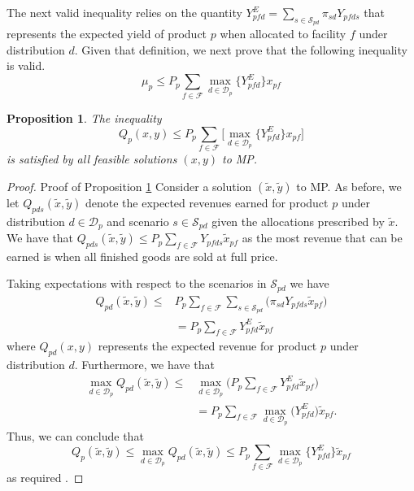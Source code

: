 \documentclass[12pt]{article}
\newtheorem{proposition}[theorem]{Proposition}%
\theoremstyle{thmstylethree}%
\begin{document}
The next valid inequality relies on the quantity $Y^E_{pfd} =  \sum_{s\in\mathcal{S}_{pd}}\pi_{sd}Y_{pfds}$ that represents the expected yield of product $p$ when allocated to facility $f$ under distribution $d.$ Given that definition, we next prove that the following inequality is valid.
\begin{equation}\label{eq:vi2}
\mu_p \leq P_p\sum_{f\in\mathcal{F}}\max_{d\in\mathcal{D}_{p}} \big\{Y^E_{pfd}\big\}x_{pf} \tag{VI2}   
\end{equation}

\noindent
\begin{proposition}\label{prop:VI2}
The inequality $$Q_p(x,y)\leq P_p\sum_{f\in\mathcal{F}}\Bigg[\max_{d\in\mathcal{D}_p}\{Y^E_{pfd}\big\}x_{pf}\Bigg]$$ is satisfied by all feasible solutions $(x,y)$ to MP.
\end{proposition}
\noindent
\begin{proof}{Proof of Proposition \ref{prop:VI2}}
Consider a solution $(\tilde{x},\tilde{y})$ to MP. As before, we let $Q_{pds}(\tilde{x},\tilde{y})$ denote the expected revenues earned for product $p$ under distribution $d \in \mathcal{D}_p$ and scenario $s\in\mathcal{S}_{pd}$ given the allocations prescribed by $\tilde{x}.$ We have that $Q_{pds}(\tilde{x},\tilde{y}) \leq P_p\sum_{f\in\mathcal{F}}Y_{pfds}\tilde{x}_{pf}$ as the most revenue that can be earned is when all finished goods are sold at full price.

Taking expectations with respect to the scenarios in $\mathcal{S}_{pd}$ we have
\begin{align*}Q_{pd}(\tilde{x},\tilde{y})\leq & P_p\sum_{f\in\mathcal{F}}\sum_{s\in\mathcal{S}_{pd}}\big(\pi_{sd}Y_{pfds}\tilde{x}_{pf}\big)\\
                             &= P_p\sum_{f\in\mathcal{F}}Y^E_{pfd}\tilde{x}_{pf}
\end{align*}
where $Q_{pd}(x,y)$ represents the expected revenue for product $p$ under distribution $d$.
Furthermore, we have that
\begin{align*}\max_{d\in\mathcal{D}_{p}}Q_{pd}(\tilde{x},\tilde{y})\leq & \max_{d\in\mathcal{D}_{p}} \big(P_p\sum_{f\in\mathcal{F}}Y^E_{pfd}\tilde{x}_{pf}\big)\\
                                    & = P_p\sum_{f\in\mathcal{F}}\max_{d\in\mathcal{D}_{p}} \big(Y^E_{pfd}\big)\tilde{x}_{pf}.
\end{align*}
Thus, we can conclude that  $$Q_{p}(\tilde{x},\tilde{y}) \leq \max_{d\in\mathcal{D}_{p}}Q_{pd}(\tilde{x},\tilde{y})\leq P_p\sum_{f\in\mathcal{F}}\max_{d\in\mathcal{D}_{p}} \{Y^E_{pfd}\}\tilde{x}_{pf}$$
as required .
\end{proof}
\end{document}
